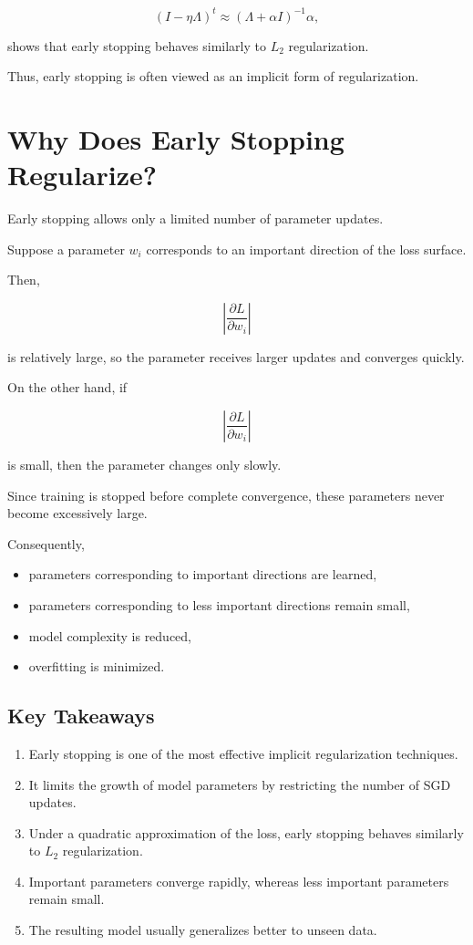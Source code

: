 \documentclass[11pt]{article}
\begin{document}
\[
(I-\eta\Lambda)^t
\approx
(\Lambda+\alpha I)^{-1}\alpha,
\]

shows that early stopping behaves similarly to
$L_2$ regularization.

Thus, early stopping is often viewed as an implicit form of
regularization.


\section{Why Does Early Stopping Regularize?}

Early stopping allows only a limited number of parameter updates.

Suppose a parameter $w_i$ corresponds to an important direction of the
loss surface.

Then,

\[
\left|
\frac{\partial L}{\partial w_i}
\right|
\]

is relatively large, so the parameter receives larger updates and
converges quickly.

On the other hand, if

\[
\left|
\frac{\partial L}{\partial w_i}
\right|
\]

is small, then the parameter changes only slowly.

Since training is stopped before complete convergence, these parameters
never become excessively large.

Consequently,

\begin{itemize}
	\item parameters corresponding to important directions are learned,
	\item parameters corresponding to less important directions remain
	small,
	\item model complexity is reduced,
	\item overfitting is minimized.
\end{itemize}


\subsection*{Key Takeaways}

\begin{enumerate}
	\item Early stopping is one of the most effective implicit regularization techniques.
	\item It limits the growth of model parameters by restricting the number of SGD updates.
	\item Under a quadratic approximation of the loss, early stopping behaves similarly to $L_2$ regularization.
	\item Important parameters converge rapidly, whereas less important parameters remain small.
	\item The resulting model usually generalizes better to unseen data.
\end{enumerate}
\end{document}
